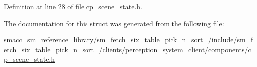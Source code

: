 Definition at line 28 of file cp\+\_\+scene\+\_\+state.\+h.



The documentation for this struct was generated from the following file\+:\begin{DoxyCompactItemize}
\item 
smacc\+\_\+sm\+\_\+reference\+\_\+library/sm\+\_\+fetch\+\_\+six\+\_\+table\+\_\+pick\+\_\+n\+\_\+sort\+\_/include/sm\+\_\+fetch\+\_\+six\+\_\+table\+\_\+pick\+\_\+n\+\_\+sort\+\_/clients/perception\+\_\+system\+\_\+client/components/\hyperlink{cp__scene__state_8h}{cp\+\_\+scene\+\_\+state.\+h}\end{DoxyCompactItemize}
